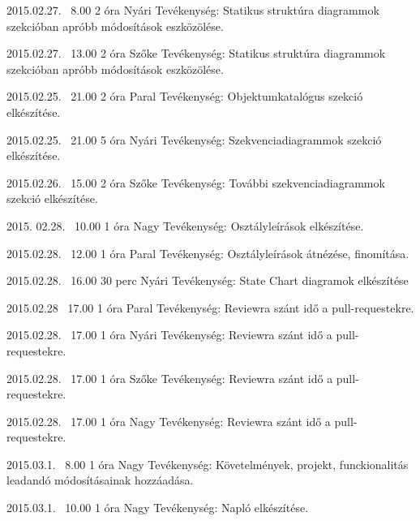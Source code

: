 \begin{naplo}
\bejegyzes
{2015.02.27. ~8.00}
{2 óra}
{Nyári} 
{Tevékenység: Statikus struktúra diagrammok szekcióban apróbb módosítások eszközölése.\newline } 

\bejegyzes
{2015.02.27. ~13.00}
{2 óra}
{Szőke} 
{Tevékenység: Statikus struktúra diagrammok szekcióban apróbb módosítások eszközölése.\newline } 

\bejegyzes
{2015.02.25. ~21.00}
{2 óra}
{Paral} 
{Tevékenység: Objektumkatalógus szekció elkészítése.\newline } 

\bejegyzes
{2015.02.25. ~21.00}
{5 óra}
{Nyári} 
{Tevékenység: Szekvenciadiagrammok szekció elkészítése.\newline } 

\bejegyzes
{2015.02.26. ~15.00}
{2 óra}
{Szőke} 
{Tevékenység: További szekvenciadiagrammok szekció elkészítése.\newline } 

\bejegyzes
{2015. 02.28. ~10.00}
{1 óra}
{Nagy}
{Tevékenység: Osztályleírások elkészítése.\newline }

\bejegyzes
{2015.02.28. ~12.00}
{1 óra}
{Paral}
{Tevékenység: Osztályleírások átnézése, finomítása.\newline}

\bejegyzes
{2015.02.28. ~16.00}
{30 perc}
{Nyári}
{Tevékenység:  State Chart diagramok elkészítése}

\bejegyzes
{2015.02.28 ~17.00}
{1 óra}
{Paral} 
{Tevékenység: Reviewra szánt idő a pull-requestekre.\newline } 

\bejegyzes
{2015.02.28. ~17.00}
{1 óra}
{Nyári} 
{Tevékenység: Reviewra szánt idő a pull-requestekre.\newline } 

\bejegyzes
{2015.02.28. ~17.00}
{1 óra}
{Szőke} 
{Tevékenység: Reviewra szánt idő a pull-requestekre.\newline } 

\bejegyzes
{2015.02.28. ~17.00}
{1 óra}
{Nagy} 
{Tevékenység: Reviewra szánt idő a pull-requestekre.\newline } 

\bejegyzes
{2015.03.1. ~8.00}
{1 óra}
{Nagy} 
{Tevékenység: Követelmények, projekt, funckionalitás leadandó módosításainak hozzáadása.\newline } 

\bejegyzes
{2015.03.1. ~10.00}
{1 óra}
{Nagy} 
{Tevékenység: Napló elkészítése.\newline } 

\end{naplo}

